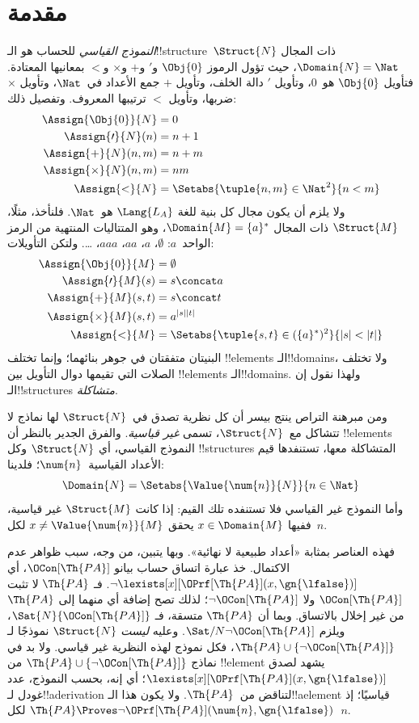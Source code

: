 \documentclass[../../../include/open-logic-section]{subfiles}
\begin{document}
\section{مقدمة}

\emph{النموذج القياسي} للحساب هو الـ!!{structure}~$\Struct{N}$
ذات المجال $\Domain{N} = \Nat$، حيث تؤول الرموز $\Obj{0}$
و$\prime$ و$+$ و$\times$ و$<$ بمعانيها المعتادة. فتأويل
$\Obj{0}$ هو~$0$، وتأويل $\prime$ دالة الخلف، وتأويل $+$
جمع الأعداد في~$\Nat$، وتأويل $\times$ ضربها، وتأويل $<$
ترتيبها المعروف. وتفصيل ذلك:
\begin{align*}
  \Assign{\Obj{0}}{N} & = 0\\
  \Assign{\prime}{N}(n) & = n + 1\\
  \Assign{+}{N}(n, m) & = n + m\\
  \Assign{\times}{N}(n, m) & = nm\\
  \Assign{<}{N} & = \Setabs{\tuple{n,m} \in \Nat^2}{n<m}
\end{align*}
ولا يلزم أن يكون مجال كل بنية للغة $\Lang{L_A}$ هو~$\Nat$.
فلنأخذ، مثلًا، $\Struct{M}$ ذات المجال $\Domain{M} = \{a\}^*$،
وهو المتتاليات المنتهية من الرمز الواحد~$a$:
$\emptyset$، $a$، $aa$، $aaa$، \dots. ولتكن التأويلات:
\begin{align*}
  \Assign{\Obj{0}}{M} & = \emptyset\\
  \Assign{\prime}{M}(s) & = s \concat a\\
  \Assign{+}{M}(s, t) & = s \concat t\\
  \Assign{\times}{M}(s, t) & = a^{\lvert s\rvert\lvert t\rvert}\\
  \Assign{<}{M} & = \Setabs{\tuple{s,t} \in (\{a\}^*)^2}{\lvert s\rvert<\lvert t\rvert}
\end{align*}
البنيتان متفقتان في جوهر بنائهما؛ وإنما تختلف !!{element}s
الـ!!{domain}s، ولا تختلف الصلات التي تقيمها دوال التأويل بين
!!{element}s الـ!!{domain}s. ولهذا نقول إن الـ!!{structure}s
\emph{متشاكلة}.

ومن مبرهنة التراص ينتج بيسر أن كل نظرية تصدق في~$\Struct{N}$
لها نماذج لا تتشاكل مع~$\Struct{N}$، تسمى \emph{غير قياسية}.
والفرق الجدير بالنظر أن !!{element}s النموذج القياسي، أي
$\Struct{N}$ وكل !!{structure}s المتشاكلة معها، تستنفدها قيم
الأعداد القياسية~$\num{n}$؛ فلدينا:
\[
\Domain{N} = \Setabs{\Value{\num{n}}{N}}{n \in \Nat}
\]
وأما النموذج غير القياسي فلا تستنفده تلك القيم: إذا كانت
$\Struct{M}$ غير قياسية، ففيها $x \in \Domain{M}$ يحقق
$x \neq \Value{\num{n}}{M}$ لكل~$n$.

فهذه العناصر بمثابة «أعداد طبيعية لا نهائية». وبها يتبين،
من وجه، سبب ظواهر عدم الاكتمال. خذ عبارة اتساق حساب بيانو
$\OCon[\Th{PA}]$، أي
$\lnot \lexists[x][\OPrf[\Th{PA}](x, \gn{\lfalse})]$.
فـ $\Th{PA}$ لا تثبت $\OCon[\Th{PA}]$ ولا $\lnot \OCon[\Th{PA}]$؛
لذلك تصح إضافة أي منهما إلى $\Th{PA}$ من غير إخلال بالاتساق.
وبما أن $\Th{PA}$ متسقة، فـ $\Sat{N}{\OCon[\Th{PA}]}$،
ويلزم $\Sat/{N}{\lnot \OCon[\Th{PA}]}$. وعليه \emph{ليست}
$\Struct{N}$ نموذجًا لـ $\Th{PA} \cup \{\lnot \OCon[\Th{PA}]\}$،
فكل نموذج لهذه النظرية غير قياسي. ولا بد في نماذج
$\Th{PA} \cup \{\lnot \OCon[\Th{PA}]\}$ من !!{element} يشهد
لصدق $\lexists[x][\OPrf[\Th{PA}](x,\gn{\lfalse})]$؛ أي إنه،
بحسب النموذج، عدد غودل لـ!!a{derivation} لتناقض من~$\Th{PA}$.
ولا يكون هذا الـ!!a{element} قياسيًا؛ إذ
$\Th{PA} \Proves \lnot \OPrf[\Th{PA}](\num{n}, \gn{\lfalse})$
لكل~$n$.
\end{document}
